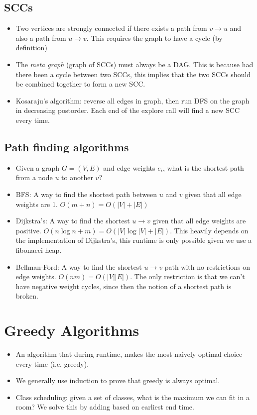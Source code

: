 \documentclass[10pt]{article}
\renewcommand{\comment}[1]{\textcolor{blue!50}{#1}}
\begin{document}
	\subsection{SCCs}
	\begin{itemize}
		\item Two vertices are strongly connected if there exists a path from \( v \to u \) and also a 
			path from \( u \to v \). This requires the graph to have a cycle (by definition)
		\item The \textit{meta graph} (graph of SCCs) must always be a DAG. This is because had there been 
			a cycle between two SCCs, this implies that the two SCCs should be combined together to form a new 
			SCC. 
		\item Kosaraju's algorithm: reverse all edges in graph, then run DFS on the graph in decreasing postorder.
			Each end of the explore call will find a new SCC every time.  
	\end{itemize}
	\subsection{Path finding algorithms}
	\begin{itemize}
		\item Given a graph \( G = (V, E) \) and edge weights \( e_i \), what is the shortest path from 
			a node \( u \) to another \( v \)?
		\item BFS: A way to find the shortest path between \( u \) and \( v \) given that all edge weights are 
			1. \( O(m + n) = O(|V| + |E|) \)
		\item Dijkstra's: A way to find the shortest \( u \to v \) given that all edge weights are positive.
			\( O(n \log n + m) = O(|V| \log|V| + |E|) \). 
			\comment{This heavily depends on the implementation of Dijkstra's, this runtime is only possible 
			given we use a fibonacci heap.}
		\item Bellman-Ford: A way to find the shortest \( u \to v \) path with no restrictions on 
			edge weights. \( O(nm) = O(|V| |E|) \). 
			\comment{The only restriction is that we can't have negative weight cycles, since then the notion 
			of a shortest path is broken.}
	\end{itemize}
	\section{Greedy Algorithms}
	\begin{itemize}
		\item An algorithm that during runtime, makes the most naively optimal choice every time (i.e. greedy). 
		\item We generally use induction to prove that greedy is always optimal.
		\item Class scheduling: given a set of classes, what is the maximum we can fit in a room? We solve this 
			by adding based on earliest end time.   
	\end{itemize}
\end{document}
